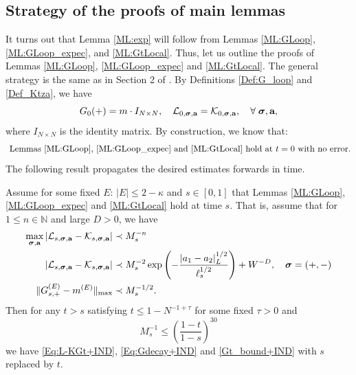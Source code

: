 \bigskip

\subsection{Strategy of the proofs of main lemmas}

It turns out that Lemma \ref{ML:exp} will follow from Lemmas \ref{ML:GLoop}, \ref{ML:GLoop_expec}, and \ref{ML:GtLocal}. Thus, let us outline the proofs of Lemmas \ref{ML:GLoop}, \ref{ML:GLoop_expec} and \ref{ML:GtLocal}. The general strategy is the same as in Section 2 of \cite{YY_25}.
By Definitions \ref{Def:G_loop} and \ref{Def_Ktza}, we have
$$
G_{0}(+)=m\cdot I_{N\times N}, \quad {\cal L}_{0, \boldsymbol{\sigma},\textbf{a}}= {\cal K}_{0, \boldsymbol{\sigma},\textbf{a}},\quad \forall \; \boldsymbol{\sigma},\textbf{a}, 
$$
where $I_{N\times N}$ is the identity matrix. By construction, we know that:
\begin{align}\label{ini)bigasya}
    \hbox{    Lemmas \ref{ML:GLoop}, \ref{ML:GLoop_expec} and \ref{ML:GtLocal} hold at  $t=0$ with no error.}
\end{align}
The following result propagates the desired estimates forwards in time.


\begin{theorem}\label{lem:main_ind} Assume for some fixed $E$: $|E|\le 2-\kappa$ and $s\in [0,1]$ that Lemmas \ref{ML:GLoop}, \ref{ML:GLoop_expec}  and \ref{ML:GtLocal} hold at time $s$. That is, assume that %
for $1 \le n\in \mathbb N$ and large $D>0$, we have
\begin{align}\label{Eq:L-KGt+IND}
 \max_{\boldsymbol{\sigma}, \textbf{a}}\left|{\cal L}_{s, \boldsymbol{\sigma}, \textbf{a}}-{\cal K}_{s, \boldsymbol{\sigma}, \textbf{a}}\right|&\prec M_{s}^{-n}  
\\\label{Eq:Gdecay+IND}
 \left| {\cal L}_{s, \boldsymbol{\sigma}, \textbf{a}}-{\cal K}_{s, \boldsymbol{\sigma}, \textbf{a}}\right|&\prec M_{s}^{-2}\exp \left(- \frac{ |a_1-a_2|_{L}^{1/2} }{\ell_s^{1/2}}\right)+W^{-D} , \quad \boldsymbol{\sigma}=(+,-)
\\\label{Gt_bound+IND}
 \|G^{(E)}_{s ,+}-m^{(E)}\|_{\max} & \prec M_{s}^{-1/2}.
\end{align}
 Then for any $t>s$ satisfying $t\leq 1-N^{-1+\tau}$ for some fixed $\tau>0$ and
\begin{equation}\label{con_st_ind}
    M_{s}^{-1}\le \left(\frac{1-t}{1-s}\right)^{30}
\end{equation}
we have 
\eqref{Eq:L-KGt+IND}, \eqref{Eq:Gdecay+IND} and \eqref{Gt_bound+IND} with $s$  replaced by $t$.   
\end{theorem}

